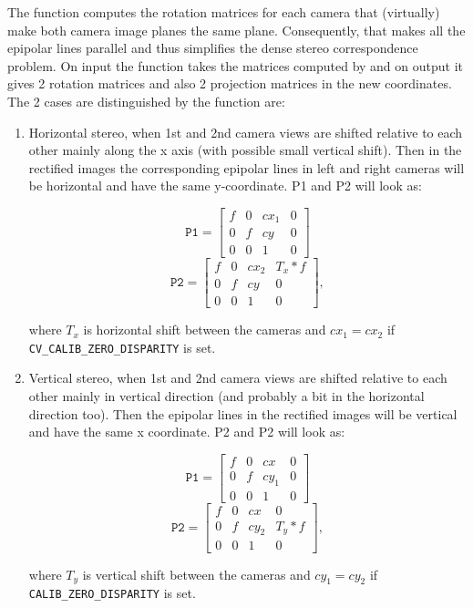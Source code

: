 The function computes the rotation matrices for each camera that (virtually) make both camera image planes the same plane. Consequently, that makes all the epipolar lines parallel and thus simplifies the dense stereo correspondence problem. On input the function takes the matrices computed by  and on output it gives 2 rotation matrices and also 2 projection matrices in the new coordinates. The 2 cases are distinguished by the function are:

\begin{enumerate}
\item Horizontal stereo, when 1st and 2nd camera views are shifted relative to each other mainly along the x axis (with possible small vertical shift). Then in the rectified images the corresponding epipolar lines in left and right cameras will be horizontal and have the same y-coordinate. P1 and P2 will look as:

\[\texttt{P1}=
\begin{bmatrix}
f & 0 & cx_1 & 0\\
0 & f & cy & 0\\
0 & 0 & 1 & 0
\end{bmatrix}
\]
\[\texttt{P2}=
\begin{bmatrix}
f & 0 & cx_2 & T_x*f\\
0 & f & cy & 0\\
0 & 0 & 1 & 0
\end{bmatrix}
,
\]

where $T_x$ is horizontal shift between the cameras and $cx_1=cx_2$ if \texttt{CV\_CALIB\_ZERO\_DISPARITY} is set.
\item Vertical stereo, when 1st and 2nd camera views are shifted relative to each other mainly in vertical direction (and probably a bit in the horizontal direction too). Then the epipolar lines in the rectified images will be vertical and have the same x coordinate. P2 and P2 will look as:

\[
\texttt{P1}=
\begin{bmatrix}
f & 0 & cx & 0\\
0 & f & cy_1 & 0\\
0 & 0 & 1 & 0
\end{bmatrix}
\]
\[
\texttt{P2}=
\begin{bmatrix}
f & 0 & cx & 0\\
0 & f & cy_2 & T_y*f\\
0 & 0 & 1 & 0
\end{bmatrix}
,
\]

where $T_y$ is vertical shift between the cameras and $cy_1=cy_2$ if \texttt{CALIB\_ZERO\_DISPARITY} is set.
\end{enumerate}

